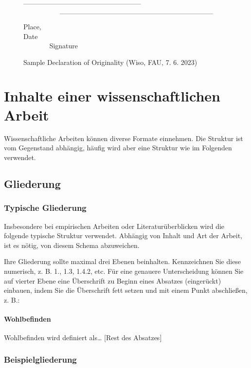 \documentclass[
  letterpaper,
  DIV=11]{scrreprt}
\begin{document}
\begin{figure}
\_\_\_\_\_\_\_\_\_\_\_\_\_\_\_\_\_\_\_\_\_\_\_~~~~~~~~~~~~~~~~~~~~~~~~~~~~~~~~~~~~
\_\_\_\_\_\_\_\_\_\_\_\_\_\_\_\_\_\_\_\_\_\_\_\_\_\_\_\_\_\_

Place,
Date~~~~~~~~~~~~~~~~~~~~~~~~~~~~~~~~~~~~~~~~~~~~~~~~~~~~~~~~~~~~~~~
Signature

\caption{\label{fig-eid-en}Sample Declaration of Originality (Wiso, FAU,
7. 6. 2023)}

\end{figure}%

\chapter{Inhalte einer wissenschaftlichen
Arbeit}\label{inhalte-einer-wissenschaftlichen-arbeit}

Wissenschaftliche Arbeiten können diverse Formate einnehmen. Die
Struktur ist vom Gegenstand abhängig, häufig wird aber eine Struktur wie
im Folgenden verwendet.

\section{Gliederung}\label{gliederung}

\subsection{Typische Gliederung}\label{typische-gliederung}

Insbesondere bei empirischen Arbeiten oder Literaturüberblicken wird die
folgende typische Struktur verwendet. Abhängig von Inhalt und Art der
Arbeit, ist es nötig, von diesem Schema abzuweichen.

Ihre Gliederung sollte maximal drei Ebenen beinhalten. Kennzeichnen Sie
diese numerisch, z. B. 1., 1.3, 1.4.2, etc. Für eine genauere
Unterscheidung können Sie auf vierter Ebene eine Überschrift zu Beginn
eines Absatzes (eingerückt) einbauen, indem Sie die Überschrift fett
setzen und mit einem Punkt abschließen, z. B.:

\subsubsection{Wohlbefinden}\label{wohlbefinden}

Wohlbefinden wird definiert als\ldots{} {[}Rest des Absatzes{]}

\subsection{Beispielgliederung}\label{beispielgliederung}
\end{document}
